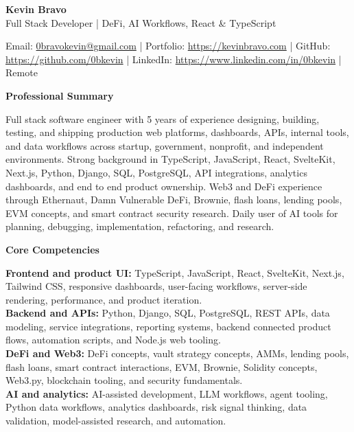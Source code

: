 \documentclass[11pt]{article}
\begin{document}
\raggedright

\begin{center}
    {\LARGE \textbf{Kevin Bravo}}\\
    Full Stack Developer | DeFi, AI Workflows, React \& TypeScript \\
    \hrulefill
\end{center}

\begin{center}
    Email: \href{mailto:0bravokevin@gmail.com}{0bravokevin@gmail.com}
    | Portfolio: \href{https://kevinbravo.com}{https://kevinbravo.com}
    | GitHub: \href{https://github.com/0bkevin}{https://github.com/0bkevin}
    | LinkedIn: \href{https://www.linkedin.com/in/0bkevin/}{https://www.linkedin.com/in/0bkevin}
    | Remote
\end{center}

\vspace{4pt}
\begin{center}
    \textbf{Professional Summary}
\end{center}
\vspace{-4pt}
Full stack software engineer with 5 years of experience designing, building, testing, and shipping production web platforms, dashboards, APIs, internal tools, and data workflows across startup, government, nonprofit, and independent environments. Strong background in TypeScript, JavaScript, React, SvelteKit, Next.js, Python, Django, SQL, PostgreSQL, API integrations, analytics dashboards, and end to end product ownership. Web3 and DeFi experience through Ethernaut, Damn Vulnerable DeFi, Brownie, flash loans, lending pools, EVM concepts, and smart contract security research. Daily user of AI tools for planning, debugging, implementation, refactoring, and research.

\vspace{7pt}
\begin{center}
    \textbf{Core Competencies}
\end{center}
\vspace{-4pt}
\textbf{Frontend and product UI:} TypeScript, JavaScript, React, SvelteKit, Next.js, Tailwind CSS, responsive dashboards, user-facing workflows, server-side rendering, performance, and product iteration. \\
\textbf{Backend and APIs:} Python, Django, SQL, PostgreSQL, REST APIs, data modeling, service integrations, reporting systems, backend connected product flows, automation scripts, and Node.js web tooling. \\
\textbf{DeFi and Web3:} DeFi concepts, vault strategy concepts, AMMs, lending pools, flash loans, smart contract interactions, EVM, Brownie, Solidity concepts, Web3.py, blockchain tooling, and security fundamentals. \\
\textbf{AI and analytics:} AI-assisted development, LLM workflows, agent tooling, Python data workflows, analytics dashboards, risk signal thinking, data validation, model-assisted research, and automation.
\end{document}
